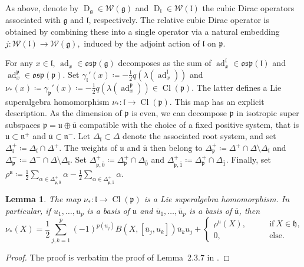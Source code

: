 \documentclass[11pt]{amsart}
\newcommand{\ad}{\operatorname{ad}}
\newcommand{\Dirac}{\operatorname{D}}
\def\ubar{{\overline{\mathfrak{u}}}}
\def\Cl{{\operatorname{Cl}}}
\def\osp{{\mathfrak{osp}}}
\def\hh{{\mathfrak h}}
\def\pp{{\mathfrak p}}
\def\uu{{\mathfrak u}}
\def\ll{{\mathfrak l}}
\def\pp{{\mathfrak p}}
\def\nn {{\mathfrak{n}}}
\def\pp{{\mathfrak{p}}}
\def\gg{{\mathfrak{g}}}
\theoremstyle{plain}
\newtheorem{lemma}[theorem]{Lemma}
\theoremstyle{remark}
\theoremstyle{definition}
\numberwithin{equation}{section}
\theoremstyle{remark}
\begin{document}
As above, denote by $\Dirac_{\gg}\in\mathcal{W}(\gg)$ and $\Dirac_{\ll}\in\mathcal{W}(\ll)$ the cubic Dirac operators associated with $\gg$ and $\ll$, respectively. The relative cubic Dirac operator is obtained by combining these into a single operator via a natural embedding
$
j\colon\mathcal{W}(\ll)\longrightarrow\mathcal{W}(\gg),
$
induced by the adjoint action of $\ll$ on $\pp$.

For any $x \in \ll$, $\ad_{x} \in \osp(\gg)$ decomposes as the sum of $\ad_{x}^{\ll} \in \osp(\ll)$ and $\ad_{x}^{\pp} \in \osp(\pp)$. Set $\gamma_{\ll}'(x)\coloneqq -\tfrac{1}{2}q(\lambda(\ad_{x}^{\ll}))$ and $\nu_{\ast}(x)\coloneqq \gamma_{\pp}'(x)\coloneqq -\tfrac{1}{2}q(\lambda(\ad_{x}^{\pp})) \in \Cl(\pp)$. The latter defines a Lie superalgebra homomorphism $\nu_{\ast} : \ll \to \Cl(\pp)$. This map has an explicit description. As the dimension of $\pp$ is even, we can decompose $\pp$ in isotropic super subspaces $\pp=\uu \oplus \ubar$ compatible with the choice of a fixed positive system, that is $\uu\subset \nn^{+}$ and $\ubar\subset \nn^{-}$. Let $\Delta_{\ll} \subset \Delta$ denote the associated root system, and set $\Delta_{\ll}^{+}\coloneqq \Delta_{\ll} \cap \Delta^{+}$. The weights of $\uu$ and $\ubar$ then belong to $\Delta_{\pp}^{+}\coloneqq \Delta^{+}\cap \Delta \setminus \Delta_{\ll}$ and $\Delta_{\pp}^{-}\coloneqq \Delta^{-}\cap \Delta \setminus \Delta_{\ll}$. Set $\Delta^{+}_{\pp,\bar{0}}\coloneqq \Delta_{\pp}^{+}\cap \Delta_{\bar{0}}$ and $\Delta^{+}_{\pp,\bar{1}}\coloneqq \Delta_{\pp}^{+}\cap \Delta_{\bar{1}}$. Finally, set $\rho^{\uu}\coloneqq \tfrac{1}{2}\sum_{\alpha \in \Delta_{\pp,\bar{0}}^{+}} \alpha-\tfrac{1}{2}\sum_{\alpha \in \Delta_{\pp,\bar{1}}^{+}} \alpha$.

\begin{lemma} \label{lemm::embedding}
 The map $\nu_{\ast} : \ll \to \Cl(\pp)$ is a Lie superalgebra homomorphism. In particular, if $u_{1},\ldots, u_{p}$ is a basis of $\uu$ and $\overline{u}_{1}, \ldots, \overline{u}_{p}$ is a basis of $\overline{\uu}$, then 
 \[
 \nu_{\ast}(X)=\frac{1}{2} \sum_{j,k=1}^{p}(-1)^{p(u_{j})}B(X,[\overline{u}_{j},u_{k}])\overline{u}_{k}u_{j} + \begin{cases}
 \rho^{\uu}(X), \qquad &\text{if} \ X \in \hh, \\
 0, \qquad &\text{else}.
 \end{cases}
 \]
\end{lemma}

\begin{proof}
 The proof is verbatim the proof of Lemma~2.3.7 in \cite{Schmidt_Noja}.
\end{proof}
\end{document}
